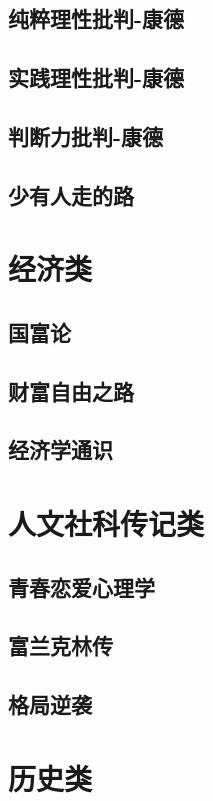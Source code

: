 \documentclass[UTF8,a4paper,12pt]{ctexbook}
\begin{document}
	\section{纯粹理性批判-康德}
	
	\section{实践理性批判-康德}
	
	\section{判断力批判-康德}
	
	\section{少有人走的路}
\chapter{经济类}
	\section{国富论}
	
	\section{财富自由之路}

	\section{经济学通识}
	
	
\chapter{人文社科传记类}
	\section{青春恋爱心理学}		
	
	\section{富兰克林传}

	\section{格局逆袭}
	
	
\chapter{历史类}
\end{document}
